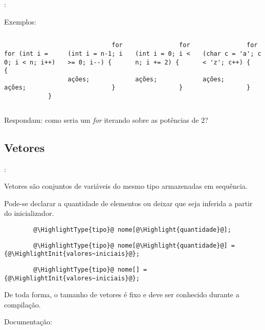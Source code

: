 \begin{frame}[fragile]{\insertsection: \insertsubsection}

	Exemplos:
	\begin{columns}
		\begin{verbatim}
			for (int i = 0; i < n; i++) {
				ações;
			}
		\end{verbatim}
		\begin{verbatim}
			for (int i = n-1; i >= 0; i--) {
				ações;
			}
		\end{verbatim}

		\begin{verbatim}
			for (int i = 0; i < n; i += 2) {
				ações;
			}
		\end{verbatim}
		\begin{verbatim}
			for (char c = 'a'; c < 'z'; c++) {
				ações;
			}
		\end{verbatim}
	\end{columns}

	\vfill
	Respondam: como seria um \emph{for} iterando sobre as potências de 2?

\end{frame}


\subsection{Vetores}


\begin{frame}[b,fragile]{\insertsection: \insertsubsection}

	Vetores são conjuntos de variáveis do mesmo tipo armazenadas em sequência.

	\bigskip
	Pode-se declarar a quantidade de elementos ou deixar que seja inferida a partir do inicializador.

	\begin{verbatim}
		@\HighlightType{tipo}@ nome[@\Highlight{quantidade}@];
	\end{verbatim}

	\begin{verbatim}
		@\HighlightType{tipo}@ nome[@\Highlight{quantidade}@] = {@\HighlightInit{valores~iniciais}@};
	\end{verbatim}

	\begin{verbatim}
		@\HighlightType{tipo}@ nome[] = {@\HighlightInit{valores~iniciais}@};
	\end{verbatim}

	De toda forma, o tamanho de vetores é fixo e deve ser conhecido durante a compilação.

	\vfill
	Documentação: 

\end{frame}


